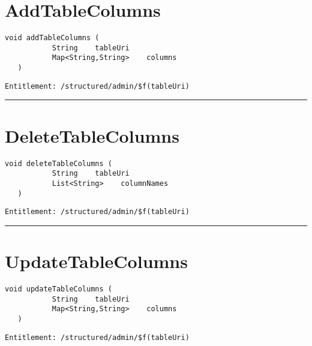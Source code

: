 \section{AddTableColumns}
\label{Api:AddTableColumns}
\begin{lstlisting}[style=nonumbers]
   void addTableColumns (
           String    tableUri
           Map<String,String>    columns
   )
\end{lstlisting}
\begin{Verbatim}[formatcom=\color{Maroon}]
  Entitlement: /structured/admin/$f(tableUri)
\end{Verbatim}



\rule{12cm}{2pt}
\section{DeleteTableColumns}
\label{Api:DeleteTableColumns}
\begin{lstlisting}[style=nonumbers]
   void deleteTableColumns (
           String    tableUri
           List<String>    columnNames
   )
\end{lstlisting}
\begin{Verbatim}[formatcom=\color{Maroon}]
  Entitlement: /structured/admin/$f(tableUri)
\end{Verbatim}



\rule{12cm}{2pt}
\section{UpdateTableColumns}
\label{Api:UpdateTableColumns}
\begin{lstlisting}[style=nonumbers]
   void updateTableColumns (
           String    tableUri
           Map<String,String>    columns
   )
\end{lstlisting}
\begin{Verbatim}[formatcom=\color{Maroon}]
  Entitlement: /structured/admin/$f(tableUri)
\end{Verbatim}



